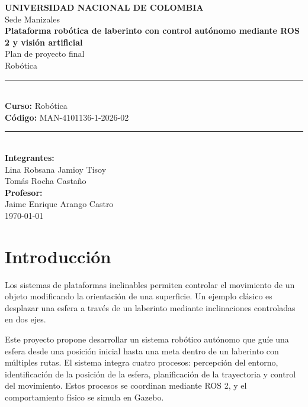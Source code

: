 \documentclass[11pt,a4paper]{article}
\begin{document}
\begin{titlepage}
    \centering
    \vspace*{2cm}

    {\Large \textbf{UNIVERSIDAD NACIONAL DE COLOMBIA}}\\[0.3cm]
    {\large Sede Manizales}\\[2cm]

    {\Huge \textbf{Plataforma robótica de laberinto con control autónomo mediante ROS 2 y visión artificial}}\\[0.5cm]
    {\Large Plan de proyecto final}\\[0.3cm]
    {\large Robótica}\\[2cm]

    \rule{\linewidth}{0.5mm}\\[0.4cm]
    {\large \textbf{Curso:} Robótica}\\
    {\large \textbf{Código:} MAN-4101136-1-2026-02}\\[0.4cm]
    \rule{\linewidth}{0.5mm}\\[1.5cm]

    {\Large \textbf{Integrantes:}}\\[0.4cm]
    {\large Lina Robsana Jamioy Tisoy}\\
    {\large Tomás Rocha Castaño}\\[2cm]

    {\large \textbf{Profesor:}}\\
    {\large Jaime Enrique Arango Castro}\\[2cm]

    \vfill
    {\large \today}

\end{titlepage}

\tableofcontents
\newpage

\section{Introducción}
Los sistemas de plataformas inclinables permiten controlar el movimiento de un objeto modificando la orientación de una superficie. Un ejemplo clásico es desplazar una esfera a través de un laberinto mediante inclinaciones controladas en dos ejes.

Este proyecto propone desarrollar un sistema robótico autónomo que guíe una esfera desde una posición inicial hasta una meta dentro de un laberinto con múltiples rutas. El sistema integra cuatro procesos: percepción del entorno, identificación de la posición de la esfera, planificación de la trayectoria y control del movimiento. Estos procesos se coordinan mediante ROS 2, y el comportamiento físico se simula en Gazebo.
\end{document}
